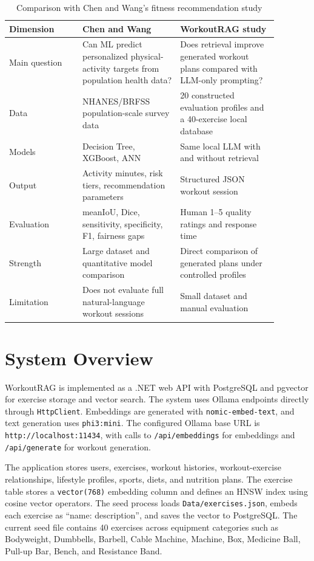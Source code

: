 \documentclass[12pt]{article}
\begin{document}
\begin{table}[h]
\centering
\caption{Comparison with Chen and Wang's fitness recommendation study}
\begin{tabular}{p{0.24\linewidth}p{0.32\linewidth}p{0.32\linewidth}}
\toprule
Dimension & Chen and Wang \cite{chen2025personalized} & WorkoutRAG study \\
\midrule
Main question & Can ML predict personalized physical-activity targets from population health data? & Does retrieval improve generated workout plans compared with LLM-only prompting? \\
Data & NHANES/BRFSS population-scale survey data & 20 constructed evaluation profiles and a 40-exercise local database \\
Models & Decision Tree, XGBoost, ANN & Same local LLM with and without retrieval \\
Output & Activity minutes, risk tiers, recommendation parameters & Structured JSON workout session \\
Evaluation & meanIoU, Dice, sensitivity, specificity, F1, fairness gaps & Human 1--5 quality ratings and response time \\
Strength & Large dataset and quantitative model comparison & Direct comparison of generated plans under controlled profiles \\
Limitation & Does not evaluate full natural-language workout sessions & Small dataset and manual evaluation \\
\bottomrule
\end{tabular}
\end{table}

\section{System Overview}
WorkoutRAG is implemented as a .NET web API with PostgreSQL and pgvector for exercise storage and vector search. The system uses Ollama endpoints directly through \texttt{HttpClient}. Embeddings are generated with \texttt{nomic-embed-text}, and text generation uses \texttt{phi3:mini}. The configured Ollama base URL is \texttt{http://localhost:11434}, with calls to \texttt{/api/embeddings} for embeddings and \texttt{/api/generate} for workout generation.

The application stores users, exercises, workout histories, workout-exercise relationships, lifestyle profiles, sports, diets, and nutrition plans. The exercise table stores a \texttt{vector(768)} embedding column and defines an HNSW index using cosine vector operators. The seed process loads \texttt{Data/exercises.json}, embeds each exercise as ``name: description'', and saves the vector to PostgreSQL. The current seed file contains 40 exercises across equipment categories such as Bodyweight, Dumbbells, Barbell, Cable Machine, Machine, Box, Medicine Ball, Pull-up Bar, Bench, and Resistance Band.
\end{document}
